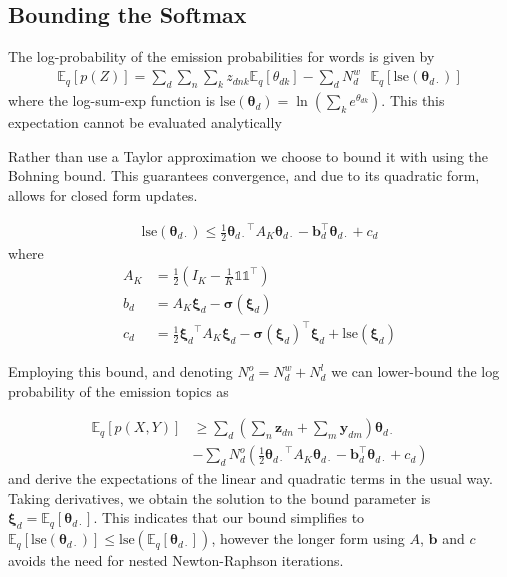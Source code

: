 \documentclass{sciposter}
\newcommand \ex[2] {
    \mathbb{E}_{ { #2 } }\left[ #1 \right]
}
\newcommand \halve[1] {
	\frac{#1}{2}
}
\newcommand \half {
    \halve{1}
}
\newcommand \T { ^\top }
\newcommand \vv[1] { \bm #1 }
\newcommand \Ed {{ \vv{\xi}_d}}
\newcommand \zdnk[0] { { z_{dnk} } }
\newcommand \thd[0]  { { \vv \theta_d } }
\newcommand \thdk[0] { { \theta_{dk} } }
\newcommand \one  {{  \mathds{1} }}
\newcommand \lse { \text{lse} }
\newcommand \thdo { { \vv{\theta}_{d\cdot} } }
\begin{document}
\begin{multicols}{3}
\section{Bounding the Softmax}
The log-probability of the emission probabilities for words is given by
\begin{align*}
\ex{p(Z)}{q} = \sum_d \sum_n \sum_k \zdnk \ex{\thdk}{q} - \sum_d N^w_d \text{ }\ex{\lse(\thdo)}{q}
\end{align*}
where the log-sum-exp function is $\lse(\thd) = \ln (\sum_k e^\thdk)$. This this expectation cannot be evaluated analytically

Rather than use a Taylor approximation\cite{Wang2013} we choose to bound it with using the Bohning bound\cite{Bohning1988}. This guarantees convergence, and due to its quadratic form, allows for closed form updates.

\begin{align*}
\lse(\thdo) \leq \half \thdo\T A_K \thdo - \vv{b}_d\T\thdo + c_d \label{eqn:lse-def}
\end{align*}
where
\begin{align*}
A_K & = \half \left( I_K - \frac{1}{K} \one \one\T \right) \\
b_d & = A_K \Ed - \vv{\sigma}(\Ed)  \\
c_d & = \frac{1}{2} \Ed\T A_K \Ed - \vv{\sigma}(\Ed)\T\Ed + \lse(\Ed)
\end{align*}

Employing this bound, and denoting $N^o_d = N^w_d + N^l_d$ we can lower-bound the log probability of the emission topics as

\begin{equation*}
\begin{aligned}
\ex{p(X,Y)}{q} & \geq \sum_d  (\sum_n \vv{z}_{dn} + \sum_m \vv{y}_{dm}) \thdo \\
   & - \sum_d N^o_d \left(\half \thdo\T A_K \thdo - \vv{b}_d\T\thdo + c_d\right)
\end{aligned}
\end{equation*}
and derive the expectations of the linear and quadratic terms in the usual way.\\

Taking derivatives, we obtain the solution to the bound parameter is $\Ed = \ex{\thdo}{q}$. This indicates that our bound simplifies to $\ex{\lse(\thdo)}{q} \leq \lse(\ex{\thdo}{q})$, however the longer form using $A$, $\vv{b}$ and $c$ avoids the need for nested Newton-Raphson iterations.\\


\end{multicols}
\end{document}
